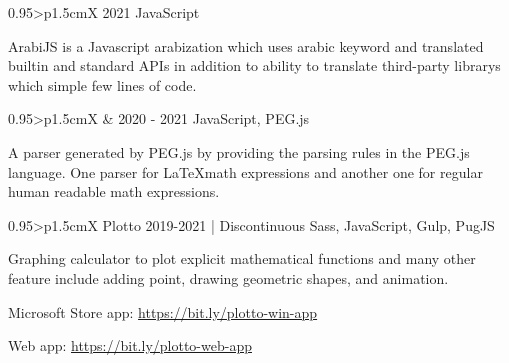 \documentclass[a4paper, oneside, final]{scrartcl} %
\begin{document}
\begin{center}
\begin{paracol}{2}
\begin{tabularx}{0.95\linewidth}{>{\raggedleft\scshape}p{1.5cm}X}
 {}
 {2021}
 {JavaScript}
\end{tabularx}

\vspace{2mm}
\parbox{0.95\linewidth}{%
ArabiJS is a Javascript arabization which uses arabic keyword and translated builtin and standard APIs in addition to ability to translate third-party librarys which simple few lines of code.
}%

\vspace{20pt}

\begin{tabularx}{0.95\linewidth}{>{\raggedleft\scshape}p{1.5cm}X}
 { \& }
 {2020 - 2021}
 {JavaScript, PEG.js}
\end{tabularx}

\vspace{2mm}
\parbox{0.95\linewidth}{%
A parser generated by PEG.js by providing the parsing rules in the PEG.js language. One parser for \LaTeX math expressions and another one for regular human readable math expressions.
}%

\vspace{20pt}

\begin{tabularx}{0.95\linewidth}{>{\raggedleft\scshape}p{1.5cm}X}
 {Plotto}
 {2019-2021 \scriptsize{| Discontinuous}}
 {Sass, JavaScript, Gulp, PugJS}
\end{tabularx}

\vspace{2mm}
\parbox{0.95\linewidth}{%
Graphing calculator to plot explicit mathematical functions and many other feature include adding point, drawing geometric shapes, and animation.
}%
\begin{items}
\item Microsoft Store app: \url{https://bit.ly/plotto-win-app}
\item Web app: \url{https://bit.ly/plotto-web-app}
\end{items}


\end{paracol}
\end{center}
\end{document}
